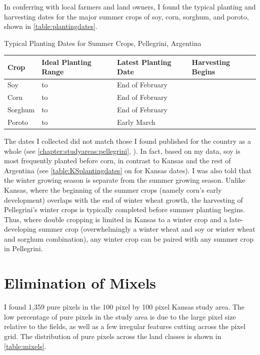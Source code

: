 In conferring with local farmers and land owners, I found the typical planting and harvesting dates for the major summer crops of soy, corn, sorghum, and poroto, shown in \autoref{table:plantingdates}.
\begin{sstable}
  \centering
  \caption{Typical Planting Dates for Summer Crops, Pellegrini, Argentina}
  \label{table:plantingdates}
  \begin{tabu}{X[0.45,m,c]X[1,m,c]X[.95,m,c]X[0.5,m,c]}
    \toprule
    \textbf{Crop} & \textbf{Ideal Planting Range} & \textbf{Latest Planting Date} & \textbf{Harvesting Begins} \\
    \midrule
    Soy &  to  & End of February &  \\
    Corn &  to  & End of February &  \\
    Sorghum &  to  & End of February &  \\
    Poroto &  to  & Early March &  \\
    \bottomrule
  \end{tabu}
\end{sstable}
The dates I collected did not match those I found published for the country as a whole (see \autoref{chapter:studyareas:pellegrini}, ). In fact, based on my data, soy is most frequently planted before corn, in contrast to Kansas and the rest of Argentina (see \autoref{table:KSplantingdates} on  for Kansas dates). I was also told that the winter growing season is separate from the summer growing season. Unlike Kansas, where the beginning of the summer crops (namely corn's early development) overlaps with the end of winter wheat growth, the harvesting of Pellegrini's winter crops is typically completed before summer planting begins. Thus, where double cropping is limited in Kansas to a winter crop and a late-developing summer crop (overwhelmingly a winter wheat and soy or winter wheat and sorghum combination), any winter crop can be paired with any summer crop in Pellegrini.


\section{Elimination of Mixels}

I found 1,359 pure pixels in the 100 pixel by 100 pixel Kansas study area. The low percentage of pure pixels in the study area is due to the large pixel size relative to the fields, as well as a few irregular features cutting across the pixel grid. The distribution of pure pixels across the land classes is shown in \autoref{table:mixels}.

